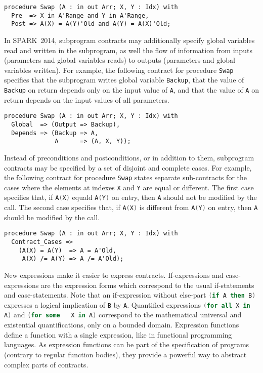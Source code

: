 \documentclass[10pt,a4paper,twocolumn]{article}
\newcommand{\newspark}{SPARK~2014\xspace}
\newcommand{\SPARK}[1]{\lstinline[language=Ada,basicstyle={\footnotesize
      \sffamily},framesep=0pt]$#1$}
\begin{document}
\begin{lstlisting}
procedure Swap (A : in out Arr; X, Y : Idx) with
  Pre  => X in A'Range and Y in A'Range,
  Post => A(X) = A(Y)'Old and A(Y) = A(X)'Old;
\end{lstlisting}

In \newspark, subprogram contracts may additionally specify global variables
read and written in the subprogram, as well the flow of information from inputs
(parameters and global variables reads) to outputs (parameters and global
variables written). For example, the following contract for procedure
\SPARK{Swap} specifies that the subprogram writes global variable
\SPARK{Backup}, that the value of \SPARK{Backup} on return depends only on the
input value of \SPARK{A}, and that the value of \SPARK{A} on return depends on
the input values of all parameters.

\begin{lstlisting}
procedure Swap (A : in out Arr; X, Y : Idx) with
  Global  => (Output => Backup),
  Depends => (Backup => A,
              A      => (A, X, Y));
\end{lstlisting}

Instead of preconditions and postconditions, or in addition to them, subprogram
contracts may be specified by a set of disjoint and complete cases. For
example, the following contract for procedure \SPARK{Swap} states separate
sub-contracts for the cases where the elements at indexes \SPARK{X} and
\SPARK{Y} are equal or different. The first case specifies that, if
\SPARK{A(X)} equald \SPARK{A(Y)} on entry, then \SPARK{A} should not be
modified by the call. The second case specifies that, if \SPARK{A(X)} is
different from \SPARK{A(Y)} on entry, then \SPARK{A} should be modified by the
call.

\begin{lstlisting}
procedure Swap (A : in out Arr; X, Y : Idx) with
  Contract_Cases =>
    (A(X) = A(Y)  => A = A'Old,
     A(X) /= A(Y) => A /= A'Old);
\end{lstlisting}

New expressions make it easier to express contracts. If-expressions and
case-expressions are the expression forms which correspond to the usual
if-statements and case-statements. Note that an if-expression without else-part
\SPARK{(if A then B)} expresses a logical implication of \SPARK{B} by
\SPARK{A}. Quantified expressions \SPARK{(for all X in A)} and \SPARK{(for some
  X in A)} correspond to the mathematical universal and existential
quantifications, only on a bounded domain. Expression functions define a
function with a single expression, like in functional programming languages. As
expression functions can be part of the specification of programs (contrary to
regular function bodies), they provide a powerful way to abstract complex parts
of contracts.
\end{document}
